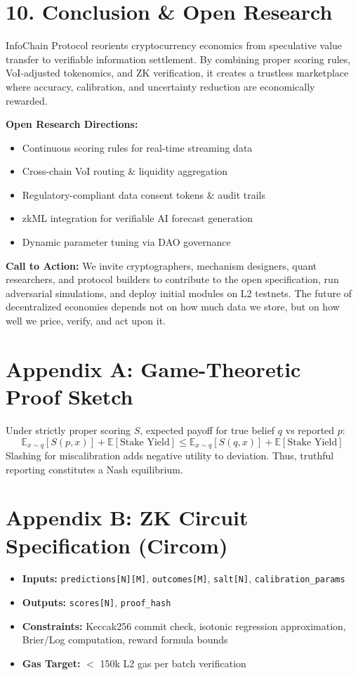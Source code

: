 \documentclass[11pt,a4paper]{article}
\begin{document}
\section*{10. Conclusion \& Open Research}
InfoChain Protocol reorients cryptocurrency economics from speculative value transfer to verifiable information settlement. By combining proper scoring rules, VoI-adjusted tokenomics, and ZK verification, it creates a trustless marketplace where accuracy, calibration, and uncertainty reduction are economically rewarded.

\noindent \textbf{Open Research Directions:}
\begin{itemize}[leftmargin=*]
    \item Continuous scoring rules for real-time streaming data
    \item Cross-chain VoI routing \& liquidity aggregation
    \item Regulatory-compliant data consent tokens \& audit trails
    \item zkML integration for verifiable AI forecast generation
    \item Dynamic parameter tuning via DAO governance
\end{itemize}
\noindent \textbf{Call to Action:} We invite cryptographers, mechanism designers, quant researchers, and protocol builders to contribute to the open specification, run adversarial simulations, and deploy initial modules on L2 testnets. The future of decentralized economies depends not on how much data we store, but on how well we price, verify, and act upon it.

\appendix
\section*{Appendix A: Game-Theoretic Proof Sketch}
Under strictly proper scoring $S$, expected payoff for true belief $q$ vs reported $p$:
\begin{equation}
\mathbb{E}_{x \sim q}[S(p,x)] + \mathbb{E}[\text{Stake Yield}] \leq \mathbb{E}_{x \sim q}[S(q,x)] + \mathbb{E}[\text{Stake Yield}]
\end{equation}
Slashing for miscalibration adds negative utility to deviation. Thus, truthful reporting constitutes a Nash equilibrium.

\section*{Appendix B: ZK Circuit Specification (Circom)}
\begin{itemize}[leftmargin=*]
    \item \textbf{Inputs:} \texttt{predictions[N][M]}, \texttt{outcomes[M]}, \texttt{salt[N]}, \texttt{calibration\_params}
    \item \textbf{Outputs:} \texttt{scores[N]}, \texttt{proof\_hash}
    \item \textbf{Constraints:} Keccak256 commit check, isotonic regression approximation, Brier/Log computation, reward formula bounds
    \item \textbf{Gas Target:} $<$ 150k L2 gas per batch verification
\end{itemize}
\end{document}
